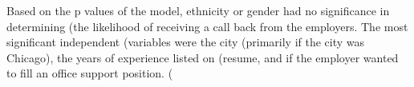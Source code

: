 



Based on the p values of the model, ethnicity or gender had no significance in determining 
(the likelihood of receiving a call back from the employers. The most significant independent 
(variables were the city (primarily if the city was Chicago), the years of experience listed on 
(resume, and if the employer wanted to fill an office support position.
( 

